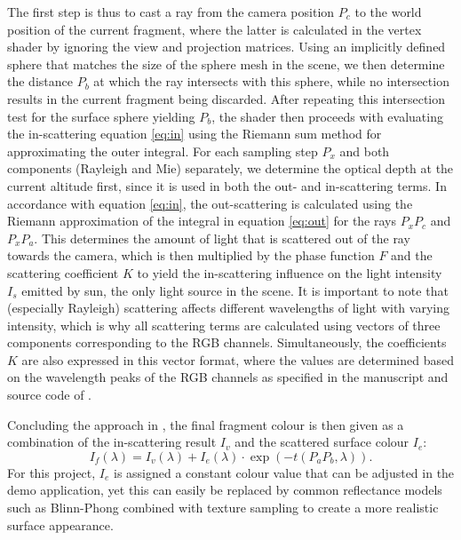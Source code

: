 \documentclass[12pt]{article}
\begin{document}
The first step is thus to cast a ray from the camera position $P_c$ to the world position of the current fragment, where the latter is calculated in the vertex shader by ignoring the view and projection matrices.
Using an implicitly defined sphere that matches the size of the sphere mesh in the scene, we then determine the distance $P_b$ at which the ray intersects with this sphere, while no intersection results in the current fragment being discarded.
After repeating this intersection test for the surface sphere yielding $P_b$, the shader then proceeds with evaluating the in-scattering equation \eqref{eq:in} using the Riemann sum method for approximating the outer integral.
For each sampling step $P_x$ and both components (Rayleigh and Mie) separately, we determine the optical depth at the current altitude first, since it is used in both the out- and in-scattering terms.
In accordance with equation \eqref{eq:in}, the out-scattering is calculated using the Riemann approximation of the integral in equation \eqref{eq:out} for the rays $P_xP_c$ and $P_xP_a$.
This determines the amount of light that is scattered out of the ray towards the camera, which is then multiplied by the phase function $F$ and the scattering coefficient $K$ to yield the in-scattering influence on the light intensity $I_s$ emitted by sun, the only light source in the scene.
It is important to note that (especially Rayleigh) scattering affects different wavelengths of light with varying intensity, which is why all scattering terms are calculated using vectors of three components corresponding to the RGB channels.
Simultaneously, the coefficients $K$ are also expressed in this vector format, where the values are determined based on the wavelength peaks of the RGB channels as specified in the manuscript and source code of \cite{oneil_chapter_nodate}.

Concluding the approach in \cite{oneil_chapter_nodate}, the final fragment colour is then given as a combination of the in-scattering result $I_v$ and the scattered surface colour $I_e$:
\begin{equation}
    I_f(\lambda) = I_v(\lambda) + I_e(\lambda) \cdot \exp\left(-t(P_aP_b, \lambda)\right).
\end{equation}
For this project, $I_e$ is assigned a constant colour value that can be adjusted in the demo application, yet this can easily be replaced by common reflectance models such as Blinn-Phong combined with texture sampling to create a more realistic surface appearance.
\end{document}
